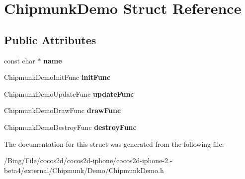 \hypertarget{struct_chipmunk_demo}{\section{Chipmunk\-Demo Struct Reference}
\label{struct_chipmunk_demo}
}
\subsection*{Public Attributes}
\begin{DoxyCompactItemize}
\item 
\hypertarget{struct_chipmunk_demo_aafe82e4e3c0029ca2c66c50fcf6258f6}{const char $\ast$ {\bfseries name}}\label{struct_chipmunk_demo_aafe82e4e3c0029ca2c66c50fcf6258f6}

\item 
\hypertarget{struct_chipmunk_demo_a3425913d73892b9a9f21b9fb667898b6}{Chipmunk\-Demo\-Init\-Func {\bfseries init\-Func}}\label{struct_chipmunk_demo_a3425913d73892b9a9f21b9fb667898b6}

\item 
\hypertarget{struct_chipmunk_demo_a80de2108e70864e84b0bcd2d3d8513d1}{Chipmunk\-Demo\-Update\-Func {\bfseries update\-Func}}\label{struct_chipmunk_demo_a80de2108e70864e84b0bcd2d3d8513d1}

\item 
\hypertarget{struct_chipmunk_demo_ad7892857c0b8439f3d901cf801307191}{Chipmunk\-Demo\-Draw\-Func {\bfseries draw\-Func}}\label{struct_chipmunk_demo_ad7892857c0b8439f3d901cf801307191}

\item 
\hypertarget{struct_chipmunk_demo_a404d070ff7f7a6c2a95d4d13d489a747}{Chipmunk\-Demo\-Destroy\-Func {\bfseries destroy\-Func}}\label{struct_chipmunk_demo_a404d070ff7f7a6c2a95d4d13d489a747}

\end{DoxyCompactItemize}


The documentation for this struct was generated from the following file\-:\begin{DoxyCompactItemize}
\item 
/\-Bing/\-File/cocos2d/cocos2d-\/iphone/cocos2d-\/iphone-\/2.-\/beta4/external/\-Chipmunk/\-Demo/Chipmunk\-Demo.\-h\end{DoxyCompactItemize}
